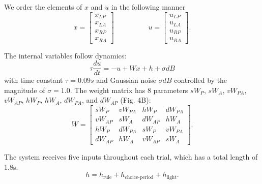 \documentclass[11pt]{article}
\begin{document}
We order the elements of $x$ and $u$ in the following manner
\begin{equation}
x = \begin{bmatrix} x_{LP} \\ x_{LA} \\ x_{RP} \\ x_{RA} \end{bmatrix} \hspace{2cm} u = \begin{bmatrix} u_{LP} \\ u_{LA} \\ u_{RP} \\ u_{RA} \end{bmatrix}.
\end{equation}

 The internal variables follow dynamics:
\begin{equation}
\tau \frac{du}{dt} = -u + Wx + h + \sigma dB
\end{equation}
with time constant $\tau = 0.09s$ and Gaussian noise $\sigma dB$ controlled by the magnitude of $\sigma=1.0$.  The weight matrix has 8 parameters $sW_P$, $sW_A$, $vW_{PA}$, $vW_{AP}$, $hW_P$, $hW_A$, $dW_{PA}$, and $dW_{AP}$ (Fig. 4B):
\begin{equation}
W = \begin{bmatrix} sW_P & vW_{PA} & hW_P & dW_{PA}  \\ vW_{AP}  & sW_A & dW_{AP}  & hW_A \\ hW_P & dW_{PA}  & sW_P & vW_{PA}  \\ dW_{AP}  & hW_A & vW_{AP}  & sW_A \end{bmatrix}.
\end{equation}

The system receives five inputs throughout each trial, which has a total length of 1.8s.
\begin{equation}
h = h_{\text{rule}} + h_{\text{choice-period}} + h_{\text{light}}.
\end{equation}
\end{document}

